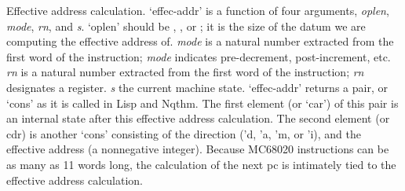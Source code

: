  Effective address calculation.  `effec-addr' is a function of
 four arguments, {\it{oplen\/}}, {\it{mode\/}}, {\it{rn\/}}, and {\it{s\/}}.  `oplen' should be {},
 {}, or {}; it is the size of the datum we are computing the
 effective address of.  {\it{mode\/}} is a natural number extracted from
 the first word of the instruction;  {\it{mode\/}} indicates pre-decrement,
 post-increment, etc.  {\it{rn\/}} is a natural number extracted from the
 first word of the instruction; {\it{rn\/}} designates a register. {\it{s\/}} the
 current machine state.  `effec-addr' returns a pair, or `cons' as it
 is called in Lisp and Nqthm.  The first element (or `car') of this
 pair is an internal state after this effective address calculation.
 The second element (or cdr) is another `cons' consisting of the
 direction ('d, 'a, 'm, or 'i),  and the effective address (a
 nonnegative integer).  Because MC68020 instructions can be as
 many as 11 words long, the calculation of the next pc is intimately
 tied to the effective address calculation.
